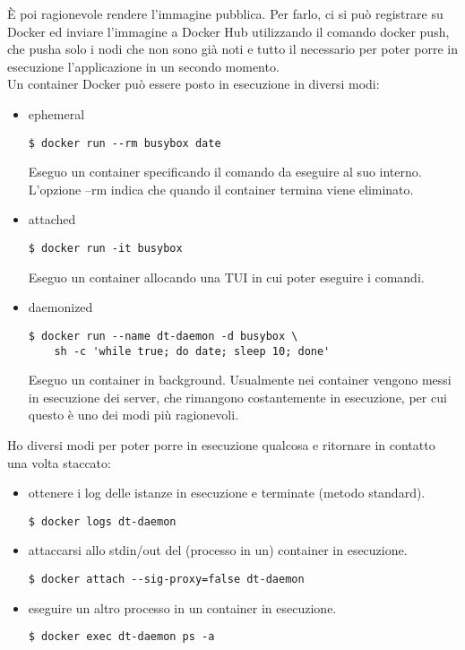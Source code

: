 \noindent È poi ragionevole rendere l'immagine pubblica. Per farlo, ci si può registrare su Docker ed inviare l'immagine a Docker Hub utilizzando il comando docker push, che pusha solo i nodi che non sono già noti e tutto il necessario per poter porre in esecuzione l'applicazione in un secondo momento.\\

\noindent Un container Docker può essere posto in esecuzione in diversi modi:
\begin{itemize}
    \item ephemeral
\begin{verbatim}
$ docker run --rm busybox date
\end{verbatim}
    Eseguo un container specificando il comando da eseguire al suo interno. L'opzione --rm indica che quando il container termina viene eliminato.
    \item attached
\begin{verbatim}
$ docker run -it busybox
\end{verbatim}
    Eseguo un container allocando una TUI in cui poter eseguire i comandi.
    \item daemonized
\begin{verbatim}
$ docker run --name dt-daemon -d busybox \
    sh -c 'while true; do date; sleep 10; done'
\end{verbatim}
    Eseguo un container in background. Usualmente nei container vengono messi in esecuzione dei server, che rimangono costantemente in esecuzione, per cui questo è uno dei modi più ragionevoli. 
\end{itemize}

\noindent Ho diversi modi per poter porre in esecuzione qualcosa e ritornare in contatto una volta staccato:

\begin{itemize}
    \item ottenere i log delle istanze in esecuzione e terminate (metodo standard).
\begin{verbatim}
$ docker logs dt-daemon
\end{verbatim}
    \item attaccarsi allo stdin/out del (processo in un) container in esecuzione.
\begin{verbatim}
$ docker attach --sig-proxy=false dt-daemon
\end{verbatim}
    \item eseguire un altro processo in un container in esecuzione.
\begin{verbatim}
$ docker exec dt-daemon ps -a
\end{verbatim}
\end{itemize}

